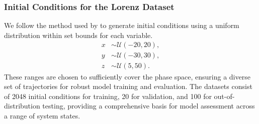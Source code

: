 
\subsubsection{Initial Conditions for the Lorenz Dataset}
We follow the method used by \textcite{Champion_2019} to generate initial conditions using a uniform distribution within set bounds for each variable.
\begin{equation}
\begin{aligned}
    x &\sim \mathcal{U}(-20, 20), \\
    y &\sim \mathcal{U}(-30, 30), \\
    z &\sim \mathcal{U}(5, 50).
\end{aligned}
\end{equation}
These ranges are chosen to sufficiently cover the phase space, ensuring a diverse set of trajectories for robust model training and evaluation. The datasets consist of 2048 initial conditions for training, 20 for validation, and 100 for out-of-distribution testing, providing a comprehensive basis for model assessment across a range of system states.




